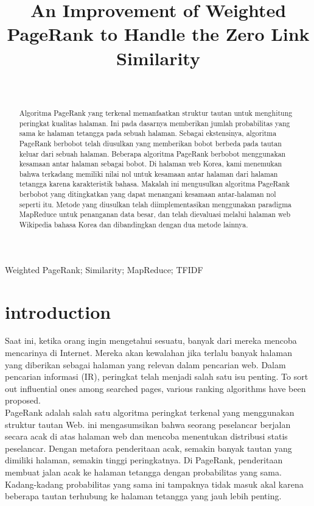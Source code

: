 \documentclass[conference]{IEEEtran}
\title{An Improvement of Weighted PageRank to Handle the Zero Link Similarity }
\author{\IEEEauthorblockN{Ricky Herlangga\\ 2022018}\\
\IEEEauthorblockA{\textit{Fakultas Teknologi Informasi}\\
\textit{Institut Teknologi Batam}\\
Batam, Indonesia\\
2022018@student.iteba.ac.id}}
\begin{document}
\maketitle

\begin{abstract}
Algoritma PageRank yang terkenal memanfaatkan struktur tautan untuk menghitung peringkat kualitas halaman.
Ini pada dasarnya memberikan jumlah probabilitas yang sama ke halaman tetangga pada sebuah halaman.
Sebagai ekstensinya, algoritma PageRank berbobot telah diusulkan yang memberikan bobot berbeda pada tautan keluar dari sebuah halaman.
Beberapa algoritma PageRank berbobot menggunakan kesamaan antar halaman sebagai bobot.
Di halaman web Korea, kami menemukan bahwa terkadang memiliki nilai nol untuk kesamaan antar halaman dari halaman tetangga karena karakteristik bahasa.
Makalah ini mengusulkan algoritma PageRank berbobot yang ditingkatkan yang dapat menangani kesamaan antar-halaman nol seperti itu.
Metode yang diusulkan telah diimplementasikan menggunakan paradigma MapReduce untuk penanganan data besar, dan telah dievaluasi melalui halaman web Wikipedia bahasa Korea dan dibandingkan dengan dua metode lainnya.
\end{abstract}

\begin{IEEEkeywords}
    Weighted     PageRank;     Similarity;     MapReduce; TFIDF 
\end{IEEEkeywords}

\section{introduction}
Saat ini, ketika orang ingin mengetahui sesuatu, banyak dari mereka mencoba mencarinya di Internet.
Mereka akan kewalahan jika terlalu banyak halaman yang diberikan sebagai halaman yang relevan dalam pencarian web.
Dalam pencarian informasi (IR), peringkat telah menjadi salah satu isu penting.
To  sort  out  influential  ones  among  searched  pages,  various ranking algorithms have been proposed. ~\cite{brin1998anatomy,xing2004weighted,qiao2010simrank}\\

PageRank\cite{brin1998anatomy} adalah salah satu algoritma peringkat terkenal yang menggunakan struktur tautan Web.
ini mengasumsikan bahwa seorang peselancar berjalan secara acak di atas halaman web dan mencoba menentukan distribusi statis peselancar.
Dengan metafora penderitaan acak, semakin banyak tautan yang dimiliki halaman, semakin tinggi peringkatnya.
Di PageRank, penderitaan membuat jalan acak ke halaman tetangga dengan probabilitas yang sama.
Kadang-kadang probabilitas yang sama ini tampaknya tidak masuk akal karena beberapa tautan terhubung ke halaman tetangga yang jauh lebih penting.\\
\end{document}
